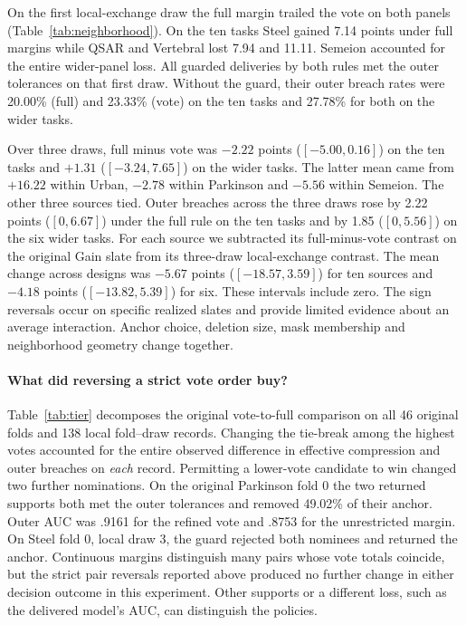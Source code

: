 On the first local-exchange draw the full margin trailed the vote on both panels (Table~\ref{tab:neighborhood}). On the ten tasks Steel gained 7.14 points under full margins while QSAR and Vertebral lost 7.94 and 11.11. Semeion accounted for the entire wider-panel loss. All guarded deliveries by both rules met the outer tolerances on that first draw. Without the guard, their outer breach rates were 20.00\% (full) and 23.33\% (vote) on the ten tasks and 27.78\% for both on the wider tasks.

Over three draws, full minus vote was $-2.22$ points ($[-5.00,0.16]$) on the ten tasks and $+1.31$ ($[-3.24,7.65]$) on the wider tasks. The latter mean came from $+16.22$ within Urban, $-2.78$ within Parkinson and $-5.56$ within Semeion. The other three sources tied. Outer breaches across the three draws rose by 2.22 points ($[0,6.67]$) under the full rule on the ten tasks and by 1.85 ($[0,5.56]$) on the six wider tasks. For each source we subtracted its full-minus-vote contrast on the original Gain slate from its three-draw local-exchange contrast. The mean change across designs was $-5.67$ points ($[-18.57,3.59]$) for ten sources and $-4.18$ points ($[-13.82,5.39]$) for six. These intervals include zero. The sign reversals occur on specific realized slates and provide limited evidence about an average interaction. Anchor choice, deletion size, mask membership and neighborhood geometry change together.

\paragraph{What did reversing a strict vote order buy?}
Table~\ref{tab:tier} decomposes the original vote-to-full comparison on all 46 original folds and 138 local fold--draw records. Changing the tie-break among the highest votes accounted for the entire observed difference in effective compression and outer breaches on \emph{each} record. Permitting a lower-vote candidate to win changed two further nominations. On the original Parkinson fold 0 the two returned supports both met the outer tolerances and removed 49.02\% of their anchor. Outer AUC was .9161 for the refined vote and .8753 for the unrestricted margin. On Steel fold 0, local draw 3, the guard rejected both nominees and returned the anchor. Continuous margins distinguish many pairs whose vote totals coincide, but the strict pair reversals reported above produced no further change in either decision outcome in this experiment. Other supports or a different loss, such as the delivered model's AUC, can distinguish the policies.

